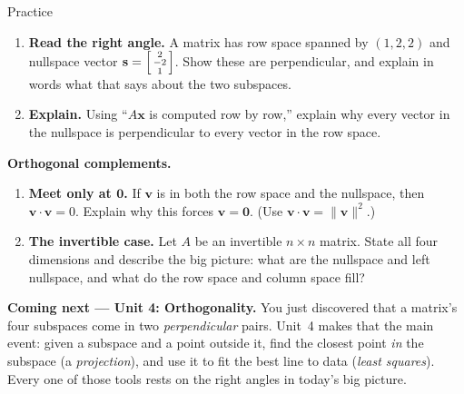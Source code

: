 \documentclass[10pt]{article}
\newcommand{\vv}{\mathbf{v}}
\newcommand{\xx}{\mathbf{x}}
\newcommand{\yy}{\mathbf{y}}
\newcommand{\svec}{\mathbf{s}}
\newcommand{\zero}{\mathbf{0}}
\begin{document}
\begin{notesbox}{Practice}
\begin{enumerate}[leftmargin=1.9em, itemsep=11pt]
        left-nullspace vector is $\yy=\begin{bsmallmatrix} 1\\1\\-1 \end{bsmallmatrix}$. \vspace{2.2cm}
  \item \textbf{Read the right angle.} A matrix has row space spanned by $(1,2,2)$ and nullspace vector
        $\svec=\begin{bsmallmatrix} 2\\-2\\1 \end{bsmallmatrix}$. Show these are perpendicular, and explain in
        words what that says about the two subspaces. 
  \item \textbf{Explain.} Using ``$A\xx$ is computed row by row,'' explain why every vector in the nullspace
        is perpendicular to every vector in the row space. 
\end{enumerate}
\end{notesbox}

\begin{extensionbox}
\textbf{Orthogonal complements.}
\begin{enumerate}[label=(\alph*), leftmargin=1.8em, itemsep=5pt]
  \item \textbf{Meet only at $\zero$.} If $\vv$ is in both the row space and the nullspace, then
        $\vv\cdot\vv=0$. Explain why this forces $\vv=\zero$. (Use $\vv\cdot\vv=\|\vv\|^2$.)
  \item \textbf{The invertible case.} Let $A$ be an invertible $n\times n$ matrix. State all four dimensions
        and describe the big picture: what are the nullspace and left nullspace, and what do the row space
        and column space fill?
\end{enumerate}
\end{extensionbox}

\begin{spiralbox}
\textbf{Coming next --- Unit 4: Orthogonality.} You just discovered that a matrix's four subspaces come in two
\emph{perpendicular} pairs. Unit~4 makes that the main event: given a subspace and a point outside it, find
the closest point \emph{in} the subspace (a \emph{projection}), and use it to fit the best line to data
(\emph{least squares}). Every one of those tools rests on the right angles in today's big picture.
\end{spiralbox}
\end{document}
